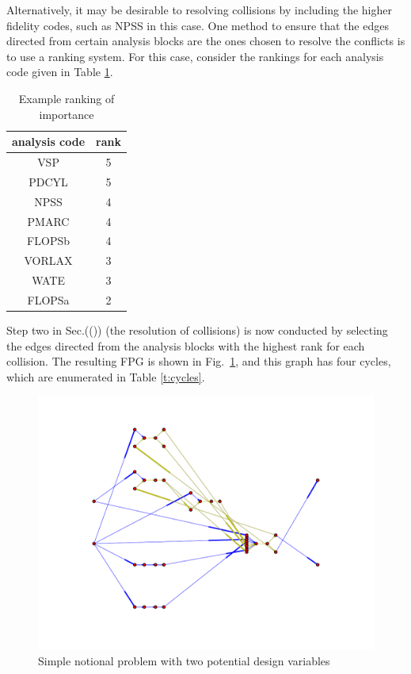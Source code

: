 Alternatively, it may be desirable to resolving collisions by including the higher fidelity codes, such as NPSS in this case.
One method to ensure that the edges directed from certain analysis blocks are the ones chosen to resolve the conflicts is to use a ranking system. For this case, consider the rankings for each analysis code given in Table \ref{t:rankings}.
\begin{table}[htbp]
  \centering
  \caption{Example ranking of importance}
    \begin{tabular}{cc}
    \toprule
    analysis code & rank \\
    \midrule
    VSP   & 5 \\
    PDCYL & 5 \\
    NPSS  & 4 \\
    PMARC & 4 \\
    FLOPSb & 4 \\
    VORLAX & 3 \\
    WATE  & 3 \\
    FLOPSa & 2 \\
    \bottomrule
    \end{tabular}%
  \label{t:rankings}%
\end{table}%
Step two in Sec.(()) (the resolution of collisions) is now conducted by selecting the edges directed from the analysis blocks with the highest rank for each collision. The resulting FPG is shown in Fig.~\ref{f:FPG highest rank}, and this graph has four cycles, which are enumerated in Table \ref{t:cycles}.
\begin{figure}[htb!]
  \begin{center}
    \includegraphics[width=.6\textwidth]{images/FPG_highest_rank}
  \end{center}
  \caption{Simple notional problem with two potential design variables \label{f:design vars}}
\label{f:FPG highest rank}
\end{figure}
